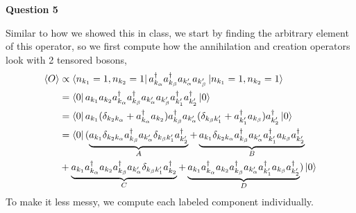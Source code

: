 \documentclass[10pt]{article}
\newcommand{\ak}[1]{a_{k_{#1}}}
\newcommand{\akp}[1]{a_{k_{#1}'}}
\begin{document}
\textbf{Question 5}

Similar to how we showed this in class, we start by finding the arbitrary element of this operator, so we first compute how the annihilation and creation operators look with 2 tensored bosons,
\begin{equation*}
  \begin{split}
    \langle O \rangle & \propto \bra{n_{k_{1}} = 1, n_{k_{2}} = 1}a_{k_{\alpha}}^{\dagger}a_{k_{\beta}}^{\dagger}a_{k'_{\alpha}}a_{k'_{\beta}}\ket{n_{k_{1}} = 1, n_{k_{2}} = 1} \\
    & = \bra{0}\ak{1}\ak{2}\ak{\alpha}^{\dagger}\ak{\beta}^{\dagger}\akp{\alpha}\akp{\beta}\akp{1}^{\dagger}\akp{2}^{\dagger}\ket{0} \\
    & = \bra{0}\ak{1}(\delta_{k_{2}k_{\alpha}} + \ak{\alpha}^{\dagger}\ak{2})\ak{\beta}^{\dagger}\akp{\alpha}(\delta_{k_{\beta}k'_{1}} + \akp{1}^{\dagger}\ak{\beta})\akp{2}^{\dagger}\ket{0} \\
    & = \bra{0}(\underbrace{\ak{1}\delta_{k_{2}k_{\alpha}}\ak{\beta}^{\dagger}\akp{\alpha}\delta_{k_{\beta}k'_{1}}\akp{2}^{\dagger}}_{A} + \underbrace{\ak{1}\delta_{k_{2}k_{\alpha}}\ak{\beta}^{\dagger}\akp{\alpha}\akp{1}^{\dagger}\ak{\beta}\akp{2}^{\dagger}}_{B} \\
    & + \underbrace{\ak{1}\ak{\alpha}^{\dagger}\ak{2}\ak{\beta}^{\dagger}\akp{\alpha}\delta_{k_{\beta}k'_{1}}\ak{2}^{\dagger}}_{C} + \underbrace{\ak{1}\ak{\alpha}^{\dagger}\ak{2}\ak{\beta}^{\dagger}\akp{\alpha}\akp{1}^{\dagger}\ak{\beta}\akp{2}^{\dagger}}_{D})\ket{0} \\
  \end{split}
\end{equation*}
To make it less messy, we compute each labeled component individually.
\end{document}
